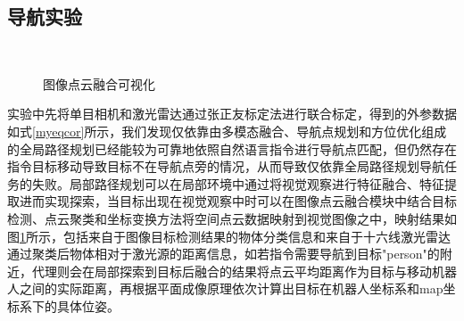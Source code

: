 \subsection{导航实验}
\begin{figure}[h]
    \centering
    \\
    \caption{图像点云融合可视化}
    \label{myfusion}
\end{figure}
实验中先将单目相机和激光雷达通过张正友标定法进行联合标定，得到的外参数据如式\ref{myeqcor}所示，我们发现仅依靠由多模态融合、导航点规划和方位优化组成的全局路径规划已经能较为可靠地依照自然语言指令进行导航点匹配，但仍然存在指令目标移动导致目标不在导航点旁的情况，从而导致仅依靠全局路径规划导航任务的失败。局部路径规划可以在局部环境中通过将视觉观察进行特征融合、特征提取进而实现探索，当目标出现在视觉观察中时可以在图像点云融合模块中结合目标检测、点云聚类和坐标变换方法将空间点云数据映射到视觉图像之中，映射结果如图\ref{myfusion}所示，包括来自于图像目标检测结果的物体分类信息和来自于十六线激光雷达通过聚类后物体相对于激光源的距离信息，如若指令需要导航到目标"person"的附近，代理则会在局部探索到目标后融合的结果将点云平均距离作为目标与移动机器人之间的实际距离，再根据平面成像原理依次计算出目标在机器人坐标系和map坐标系下的具体位姿。
